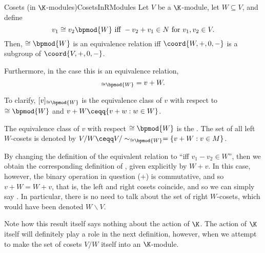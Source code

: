 \begin{prp}{Cosets (in $\K$-modules)}{CosetsInRModules}
	Let $V$ be a $\K$-module, let $W\subseteq V$, and define
	\begin{equation}
	v_1\cong v_2\bpmod{W}\text{ iff }-v_2+v_1\in N\text{ for }v_1,v_2\in V.
	\end{equation}
	Then, $\cong \bpmod{W}$ is an equivalence relation iff $\coord{W,+,0,-}$ is a subgroup of $\coord{V,+,0,-}$.
	
	Furthermore, in the case this is an equivalence relation,
	\begin{equation}
	[v]_{\cong \bpmod{W}}=v+W.
	\end{equation}
	\begin{rmk}
		To clarify, $[v]_{\cong \bpmod{W}}$ is the equivalence class of $v$ with respect to $\cong \bpmod{W}$ and $v+W\ceqq \{ v+w:w\in W\}$.
	\end{rmk}
	\begin{rmk}
		The equivalence class of $v$ with respect $\cong \bpmod{W}$ is the .  The set of all left $W$-cosets is denoted by $V/W\ceqq V/\sim _{\cong \bpmod{W}}=\left\{ v+W:v\in M\right\}$.
	\end{rmk}
	\begin{rmk}
		By changing the definition of the equivalent relation to ``\textellipsis iff $v_1-v_2\in W$'', then we obtain the corresponding definition of , given explicitly by $W+v$.  In this case, however, the binary operation in question ($+$) is commutative, and so $v+W=W+v$, that is, the left and right cosets coincide, and so we can simply say .  In particular, there is no need to talk about the set of right $W$-cosets, which would have been denoted $W\backslash V$.
	\end{rmk}
	\begin{rmk}
		Note how this result itself says nothing about the action of $\K$.  The action of $\K$ itself will definitely play a role in the next definition, however, when we attempt to make the set of cosets $V/W$ itself into an $\K$-module.
	\end{rmk}
\end{prp}
